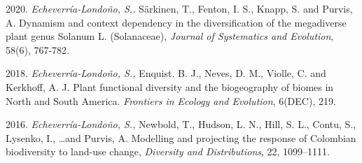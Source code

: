 \documentclass[icon]{twentysecondcv}
\begin{document}
\small  2020. \textit{Echeverr\'ia-Londo\~no, S,.}  S{\"a}rkinen, T., Fenton, I. S., Knapp, S. and Purvis, A. Dynamism and context dependency in the diversification of the megadiverse plant genus Solanum L. (Solanaceae), \textit{Journal of Systematics and Evolution},  58(6), 767-782. 

\small  2018. \textit{Echeverr\'ia-Londo\~no, S.,} Enquist. B. J., Neves, D. M., Violle, C. and Kerkhoff, A. J. Plant functional diversity and the biogeography of biomes in North and South America. \textit{Frontiers in Ecology and Evolution}, 6(DEC), 219.

\small  2016. \textit{Echeverr\'ia-Londo\~no, S.,} Newbold, T., Hudson, L. N., Hill, S. L., Contu, S., Lysenko, I., \dots and Purvis, A. Modelling and projecting the response of Colombian biodiversity to land-use change, \textit{Diversity and Distributions}, 22, 1099--1111. 
\end{document}
